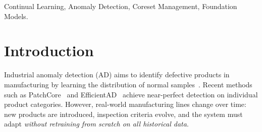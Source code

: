 \documentclass[conference]{IEEEtran}
\newcommand{\method}{MemoryAD}
\begin{document}
\begin{abstract}
Industrial anomaly detection (AD) systems must adapt to new product categories over time without forgetting previously learned defect patterns---a challenge known as class-incremental learning (CIL). Existing approaches apply CIL regularisation strategies (EWC, LwF, replay) to trainable AD backbones, inheriting both their complexity and susceptibility to catastrophic forgetting. We propose \method{}, a training-free framework that achieves \emph{near-zero forgetting by design}. \method{} extracts frozen features from a foundation model (DINOv2), maintains a fixed-budget coreset via adaptive greedy $k$-center selection, and scores anomalies using $k$-NN distance. Since no model weights are ever updated, the only source of performance change for old categories is coreset budget compression, yielding negligible degradation in practice. On MVTec AD with 15 categories across 5 incremental tasks, \method{} achieves 94.0\% ± 0.8\% I-AUROC with a forgetting rate of only 0.97\%, outperforming EWC+RD4AD (74.1\%), LwF+RD4AD (70.0\%), and Replay+RD4AD (83.7\%), while approaching the joint upper bound (95.1\%). The method scales gracefully to 15 tasks with no performance degradation, generalises to VisA (90.3\% I-AUROC), and operates at 29.6~ms/image evaluation-only throughput.
\end{abstract}

\begin{IEEEkeywords}
Continual Learning, Anomaly Detection, Coreset Management, Foundation Models.
\end{IEEEkeywords}

\section{Introduction}

Industrial anomaly detection (AD) aims to identify defective products in manufacturing by learning the distribution of normal samples~\cite{bergmann2019mvtec}. Recent methods such as PatchCore~\cite{roth2022patchcore} and EfficientAD~\cite{batzner2024efficientad} achieve near-perfect detection on individual product categories. However, real-world manufacturing lines change over time: new products are introduced, inspection criteria evolve, and the system must adapt \emph{without retraining from scratch on all historical data}.
\end{document}
